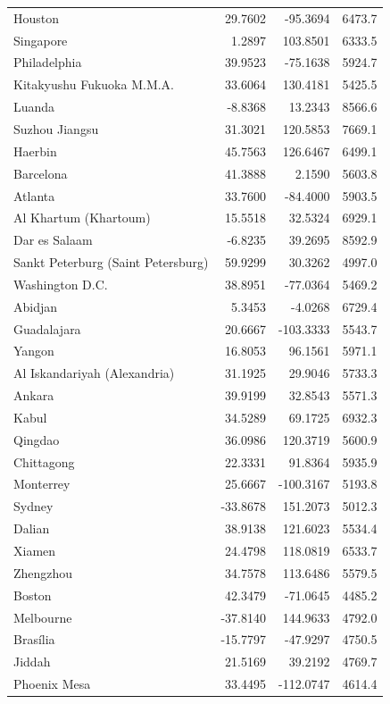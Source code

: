 \begin{longtable}{lrrc}
Houston & 29.7602 & -95.3694 & 6473.7 \\
Singapore & 1.2897 & 103.8501 & 6333.5 \\
Philadelphia & 39.9523 & -75.1638 & 5924.7 \\
Kitakyushu Fukuoka M.M.A. & 33.6064 & 130.4181 & 5425.5 \\
Luanda & -8.8368 & 13.2343 & 8566.6 \\
Suzhou  Jiangsu & 31.3021 & 120.5853 & 7669.1 \\
Haerbin & 45.7563 & 126.6467 & 6499.1 \\
Barcelona & 41.3888 & 2.1590 & 5603.8 \\
Atlanta & 33.7600 & -84.4000 & 5903.5 \\
Al Khartum (Khartoum) & 15.5518 & 32.5324 & 6929.1 \\
Dar es Salaam & -6.8235 & 39.2695 & 8592.9 \\
Sankt Peterburg (Saint Petersburg) & 59.9299 & 30.3262 & 4997.0 \\
Washington  D.C. & 38.8951 & -77.0364 & 5469.2 \\
Abidjan & 5.3453 & -4.0268 & 6729.4 \\
Guadalajara & 20.6667 & -103.3333 & 5543.7 \\
Yangon & 16.8053 & 96.1561 & 5971.1 \\
Al Iskandariyah (Alexandria) & 31.1925 & 29.9046 & 5733.3 \\
Ankara & 39.9199 & 32.8543 & 5571.3 \\
Kabul & 34.5289 & 69.1725 & 6932.3 \\
Qingdao & 36.0986 & 120.3719 & 5600.9 \\
Chittagong & 22.3331 & 91.8364 & 5935.9 \\
Monterrey & 25.6667 & -100.3167 & 5193.8 \\
Sydney & -33.8678 & 151.2073 & 5012.3 \\
Dalian & 38.9138 & 121.6023 & 5534.4 \\
Xiamen & 24.4798 & 118.0819 & 6533.7 \\
Zhengzhou & 34.7578 & 113.6486 & 5579.5 \\
Boston & 42.3479 & -71.0645 & 4485.2 \\
Melbourne & -37.8140 & 144.9633 & 4792.0 \\
Brasília & -15.7797 & -47.9297 & 4750.5 \\
Jiddah & 21.5169 & 39.2192 & 4769.7 \\
Phoenix Mesa & 33.4495 & -112.0747 & 4614.4 \\

\end{longtable}
